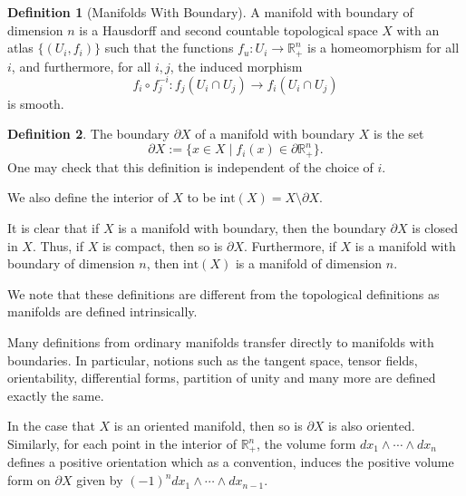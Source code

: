 \documentclass[]{article}
\theoremstyle{definition}
\theoremstyle{definition}
\newtheorem{definition}{Definition}[section]
\begin{document}
\begin{definition}[Manifolds With Boundary]
  A manifold with boundary of dimension \(n\) is a Hausdorff and second countable 
  topological space \(X\) with an atlas \(\{(U_i, f_i)\}\) such that the functions 
  \(f_u : U_i \to \mathbb{R}^n_+\) is a homeomorphism for all \(i\), and furthermore,  
  for all \(i, j\), the induced morphism 
  \[f_i \circ f_j^{-i} : f_j(U_i \cap U_j) \to f_i(U_i \cap U_j)\]
  is smooth.
\end{definition}

\begin{definition}
  The boundary \(\partial X\) of a manifold with boundary \(X\) is the set 
  \[\partial X := \{x \in X \mid f_i(x) \in \partial \mathbb{R}^n_+\}.\]
  One may check that this definition is independent of the choice of \(i\).

  We also define the interior of \(X\) to be \(\text{int}(X) = X \setminus \partial X\).
\end{definition}

It is clear that if \(X\) is a manifold with boundary, then the boundary 
\(\partial X\) is closed in \(X\). Thus, if \(X\) is compact, then so is 
\(\partial X\). Furthermore, if \(X\) is a manifold with boundary of dimension 
\(n\), then \(\text{int}(X)\) is a manifold of dimension \(n\). 

We note that these definitions are different from the topological definitions 
as manifolds are defined intrinsically.

Many definitions from ordinary manifolds transfer directly to manifolds with 
boundaries. In particular, notions such as the tangent space, tensor fields, 
orientability, differential forms, partition of unity and many more are defined 
exactly the same. 

In the case that \(X\) is an oriented manifold, then so is \(\partial X\) is 
also oriented. Similarly, for each point in the interior of \(\mathbb{R}^n_+\), 
the volume form \(dx_1 \wedge \cdots \wedge dx_n\) defines a positive 
orientation which as a convention, induces the positive volume form on \(\partial X\) 
given by \((-1)^n dx_1 \wedge \cdots \wedge dx_{n - 1}\).
\end{document}

